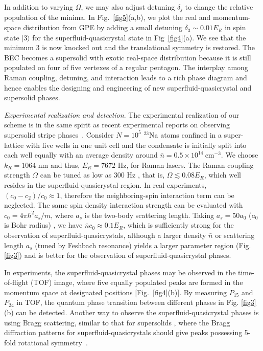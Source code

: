 \documentclass[twocolumn,prl,floatfix,citeautoscript,nofootinbib]{revtex4}
\begin{document}
In addition to varying $\Omega$, we may also adjust detuning $\delta_j$ to
change the relative population of the minima. In Fig.~\ref{fig5}(a,b), we
plot the real and momentum-space distribution from GPE by adding a small
detuning $\delta_3 \sim 0.01E_{R}$ in spin state $|3\rangle $ for the
superfluid-quasicrystal state in Fig~\ref{fig4}(a). We see that the minimum
3 is now knocked out and the translational symmetry is restored. The BEC
becomes a supersolid with exotic real-space distribution because it is still
populated on four of five vertexes of a regular pentagon. The interplay
among Raman coupling, detuning, and interaction leads to a rich phase
diagram and hence enables the designing and engineering of new
superfluid-quasicrystal and supersolid phases.

\emph{Experimental realization and detection}. The experimental realization
of our scheme is in the same spirit as recent experimental reports on
observing supersolid stripe phases~\cite{Li2017,Li2016}. Consider $N=10^{5}$
${}^{23}$Na atoms confined in a super-lattice with five wells in one unit
cell and the condensate is initially split into each well equally with an
average density around $\bar{n}=0.5\times 10^{14}~\text{cm}^{-3}$. We choose
$k_{R}=1064$ nm and thus, $E_{R}=7672$ Hz, for Raman lasers. The Raman
coupling strength $\Omega $ can be tuned as low as $300$ Hz \cite%
{Li2017,Li2016}, that is, $\Omega \lesssim 0.08E_{R}$, which well resides in
the superfluid-quasicrystal region. In real experiments, $%
(c_{0}-c_{2})/c_{0}\approx 1$, therefore the neighboring-spin interaction
term can be neglected. The same spin density interaction strength can be
evaluated with $c_{0}=4\pi \hbar ^{2}a_{s}/m$, where $a_{s}$ is the two-body
scattering length. Taking $a_{s}=50a_{0}$ ($a_{0}$ is Bohr radius) \cite%
{Abeelen1999,Knoop2011}, we have $\bar{n}c_{0}\approx 0.1E_{R}$, which is
sufficiently strong for the observation of superfluid-quasicrystals,
although a larger density $\bar{n}$ or scattering length $a_{s}$ (tuned by
Feshbach resonance) yields a larger parameter region (Fig. \ref{fig3}) and
is better for the observation of superfluid-quasicrystal phases.

In experiments, the superfluid-quasicrystal phases may be observed in the
time-of-flight (TOF) image, where five equally populated peaks are formed in
the momentum space at designated positions [Fig.~\ref{fig4}(b)]. By
measuring $P_{15}$ and $P_{24}$ in TOF, the quantum phase transition between
different phases in Fig. \ref{fig3}(b) can be detected. Another way to
observe the superfluid-quasicrystal phases is using Bragg scattering,
similar to that for supersolids \cite{Li2017}, where the Bragg diffraction
patterns for superfluid-quasicrystals should give peaks possessing 5-fold
rotational symmetry~\cite{Levine1984}.
\end{document}
